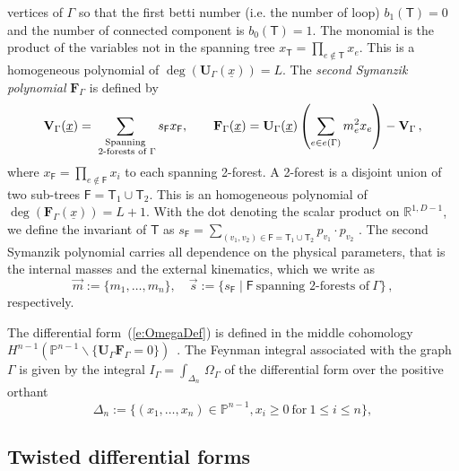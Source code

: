 \documentclass[a4paper,12pt]{article}
\numberwithin{equation}{section}
\numberwithin{figure}{section}
\begin{document}
vertices of $\Gamma$ so that the first betti number (i.e. the number
of loop) $b_1(\mathsf{T}) =0$ and the number of connected component
is 
$b_0(\mathsf{T})=1$. The
monomial is the product of the variables not in the spanning tree
$x_{\mathsf{T}} = \prod_{e\notin {\mathsf{T}}} x_e$.  This is a
homogeneous polynomial of 
$\deg(\textbf{U}_\Gamma(\underline x))=L$.
The {\em second 
	Symanzik polynomial}  $\textbf{F}_\Gamma$ is defined by
\begin{equation}\label{e:VFdef}
	{\bf V}_{\Gamma} (\underline x)= \sum_{\substack{ \text{Spanning} \\ \text{ 2-forests
				of } \Gamma}}s_{\mathsf{F}} x_{\mathsf{F}}
	,\qquad {\bf F}_{\Gamma}(\underline x) = {\bf
		U}_\Gamma(\underline x)\left( \sum_{e \in e(\Gamma)} m_e^2 x_e\right) - {\bf V}_{\Gamma}\,,
\end{equation}
where $x_{\mathsf{F}} =
\prod_{e \notin \mathsf{F}} x_i$ to each spanning 2-forest. A 2-forest
is a disjoint union of two sub-trees $\mathsf{F}=\mathsf{T}_1\cup \mathsf{T}_2$. 
This is an
homogeneous polynomial of  
$\deg(\textbf{F}_\Gamma(\underline x))=L+1$.
With the dot denoting the scalar product on $\mathbb R^{1,D-1}$,  we define the invariant of $\mathsf T$ as $s_\mathsf{F} = \sum_{(v_1,v_2) \in \mathsf{F}=\mathsf{T}_1\cup \mathsf{T}_2} p_{v_1}\cdot p_{v_2}$ .
The second Symanzik polynomial carries all dependence on the physical parameters, that is 
the
internal masses and the external kinematics, which we  write as 
\begin{equation}
	\vec m:=\{m_1,\dots,m_n\}, \quad  \vec s:=\{s_\textsf{F} \mid \textsf{F} ~ \textrm{spanning
		2-forests of}~\Gamma\}\, ,	
\end{equation}
respectively.



The differential form~(\ref{e:OmegaDef}) is defined in the middle cohomology $H^{n-1}(\mathbb P^{n-1}\backslash
\{\textbf{U}_\Gamma \textbf{F}_\Gamma=0\})$~\cite{bek,Brown:2009ta}.
The Feynman integral associated with the graph $\Gamma$ is 
given by the integral $  I_\Gamma = \int_{\Delta_n}
\, \Omega_\Gamma$ of the  differential form over
the positive orthant
\begin{equation}\label{e:Deltan}
	\Delta_n:=\{(x_1,\dots,x_n)\in \mathbb P^{n-1}, x_i \geq0 ~\textrm{for}~ 1\leq
	i\leq n\},
\end{equation}

\subsection{Twisted differential forms}\label{sec:Twisted}
\end{document}
